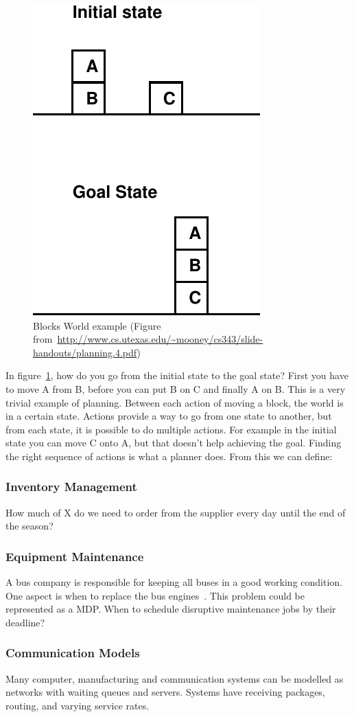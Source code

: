 \documentclass[runningheads,a4paper]{llncs}
\begin{document}
\begin{figure}[htb]%
\includegraphics[width=0.4\columnwidth]{blocksworld.pdf}%
\caption{Blocks World example (Figure from~\url{http://www.cs.utexas.edu/~mooney/cs343/slide-handouts/planning.4.pdf})}%
\label{fig:blocksworld}%
\end{figure}

In figure~\ref{fig:blocksworld}, how do you go from the initial state to the
goal state? First you have to move A from B, before you can put B on C and
finally A on B. This is a very trivial example of planning. Between each
action of moving a block, the world is in a certain state. Actions provide
a way to go from one state to another, but from each state, it is possible
to do multiple actions. For example in the initial state you can move C onto
A, but that doesn't help achieving the goal. Finding the right sequence of
actions is what a planner does. From this we can define:

\subsubsection{Inventory Management} How much of X do we need to order from the
supplier every day until the end of the season?

\subsubsection{Equipment Maintenance} A bus company is responsible for keeping
all buses in a good working condition. One aspect is when to replace the bus
engines~\cite{puterman2009markov}. This problem could be represented as a
MDP\@.  When to schedule disruptive maintenance jobs by their deadline?

\subsubsection{Communication Models} Many computer, manufacturing and
communication systems can be modelled as networks with waiting queues and
servers. Systems have receiving packages, routing, and varying service rates.
\end{document}
